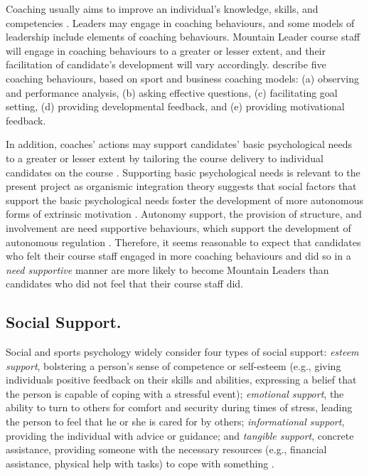 \documentclass[
  12pt,
  a4paper,
]{book}
\begin{document}
Coaching usually aims to improve an individual's knowledge, skills, and competencies \citep{Wagstaff2018}. Leaders may engage in coaching behaviours, and some models of leadership \citep[e.g., transformational leadership theory;][]{Bass1985} include elements of coaching behaviours. Mountain Leader course staff will engage in coaching behaviours to a greater or lesser extent, and their facilitation of candidate's development will vary accordingly. \citet{Wagstaff2018} describe five coaching behaviours, based on sport and business coaching models: (a) observing and performance analysis, (b) asking effective questions, (c) facilitating goal setting, (d) providing developmental feedback, and (e) providing motivational feedback.

In addition, coaches' actions may support candidates' basic psychological needs to a greater or lesser extent by tailoring the course delivery to individual candidates on the course \citep{Arthur2019, Markland2010}. Supporting basic psychological needs is relevant to the present project as organismic integration theory suggests that social factors that support the basic psychological needs foster the development of more autonomous forms of extrinsic motivation \citep{Deci1991, Ryan1995, Ryan2002}. Autonomy support, the provision of structure, and involvement are need supportive behaviours, which support the development of autonomous regulation \citep{Ryan2016, Markland2010, Silva2010}. Therefore, it seems reasonable to expect that candidates who felt their course staff engaged in more coaching behaviours and did so in a \emph{need supportive} manner are more likely to become Mountain Leaders than candidates who did not feel that their course staff did.

\hypertarget{gen-intro-social-support}{%
\subsection{Social Support.}\label{gen-intro-social-support}}

Social and sports psychology widely consider four types of social support: \emph{esteem support}, bolstering a person's sense of competence or self-esteem (e.g., giving individuals positive feedback on their skills and abilities, expressing a belief that the person is capable of coping with a stressful event); \emph{emotional support}, the ability to turn to others for comfort and security during times of stress, leading the person to feel that he or she is cared for by others; \emph{informational support}, providing the individual with advice or guidance; and \emph{tangible support}, concrete assistance, providing someone with the necessary resources (e.g., financial assistance, physical help with tasks) to cope with something \citep[e.g.,][]{Cutrona1990a, Cutrona1990b, Freeman2010, Freeman2014, Rees2007a, Rees2007}.
\end{document}

